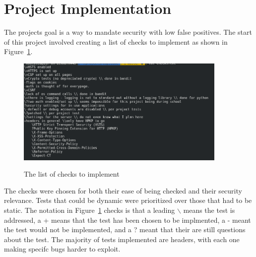 \section{Project Implementation}
The projects goal is a way to mandate security with low false positives. The start of this project involved creating a list of checks to implement as shown in Figure~\ref{fig:fig1}.
\begin{figure}[!ht]
  \centering
\includegraphics[width=4in]{unittestchecks}
\caption{\label{fig:fig1}}The list of checks to implement
\end{figure}
The checks were chosen for both their ease of being checked and their security relevance. Tests that could be dynamic were prioritized over those that had to be static. The notation in 
Figure~\ref{fig:fig1} checks is that a leading $\backslash$ means the test is addressed, a + means that the test has been chosen to be implmented, a - meant the test would not be implemented, and a ?
meant that their are still questions about the test. The majority of tests implemented are headers, with each one making specifc bugs harder to exploit.

